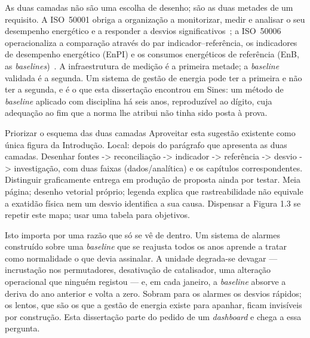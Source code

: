 As duas camadas não são uma escolha de desenho; são as duas metades de
um requisito. A ISO~50001 obriga a organização a monitorizar, medir e
analisar o seu desempenho energético e a responder a desvios
significativos~\cite[\S9.1]{ISO50001_2018}; a ISO~50006 operacionaliza a
comparação através do par indicador--referência, os indicadores de
desempenho energético (EnPI) e os consumos energéticos de referência
(EnB, as \emph{baselines})~\cite{ISO50006_2014}. A infraestrutura de
medição é a primeira metade; a \emph{baseline} validada é a segunda. Um
sistema de gestão de energia pode ter a primeira e não ter a segunda, e
é o que esta dissertação encontrou em Sines: um método de
\emph{baseline} aplicado com disciplina há seis anos, reproduzível ao
dígito, cuja adequação ao fim que a norma lhe atribui não tinha sido
posta à prova.

{Priorizar o esquema das duas camadas}
{Aproveitar esta sugestão existente como única figura da Introdução.
Local: depois do parágrafo que apresenta as duas camadas. Desenhar fontes
-\textgreater{} reconciliação -\textgreater{} indicador -\textgreater{} referência -\textgreater{} desvio -\textgreater{} investigação,
com duas faixas (dados/analítica) e os capítulos correspondentes.
Distinguir graficamente entrega em produção de proposta ainda por testar.
Meia página; desenho vetorial próprio; legenda explica que rastreabilidade
não equivale a exatidão física nem um desvio identifica a sua causa.
Dispensar a Figura 1.3 se repetir este mapa; usar uma tabela para objetivos.}%

Isto importa por uma razão que só se vê de dentro. Um sistema de alarmes
construído sobre uma \emph{baseline} que se reajusta todos os anos
aprende a tratar como normalidade o que devia assinalar. A unidade
degrada-se devagar --- incrustação nos permutadores, desativação de
catalisador, uma alteração operacional que ninguém registou --- e, em
cada janeiro, a \emph{baseline} absorve a deriva do ano anterior e volta
a zero. Sobram para os alarmes os desvios rápidos; os lentos, que são
os que a gestão de energia existe para apanhar, ficam invisíveis por
construção. Esta dissertação parte do pedido de um \emph{dashboard} e
chega a essa pergunta.

